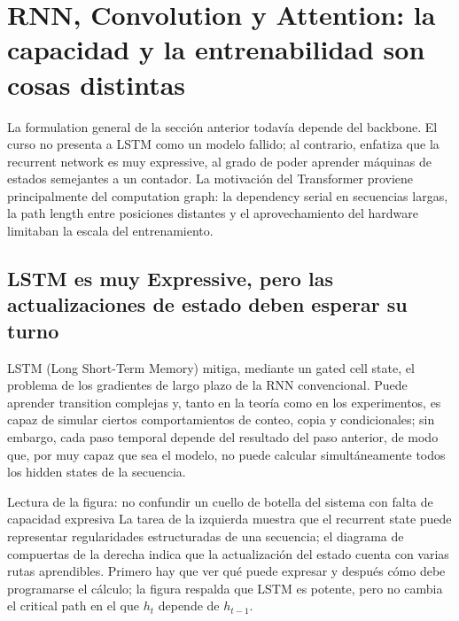 \section{RNN, Convolution y Attention: la capacidad y la entrenabilidad son cosas distintas}

La formulation general de la sección anterior todavía depende del backbone. El curso no presenta a LSTM como un modelo fallido; al contrario, enfatiza que la recurrent network es muy expressive, al grado de poder aprender máquinas de estados semejantes a un contador. La motivación del Transformer proviene principalmente del computation graph: la dependency serial en secuencias largas, la path length entre posiciones distantes y el aprovechamiento del hardware limitaban la escala del entrenamiento.

\subsection{LSTM es muy Expressive, pero las actualizaciones de estado deben esperar su turno}

LSTM (Long Short-Term Memory) mitiga, mediante un gated cell state, el problema de los gradientes de largo plazo de la RNN convencional. Puede aprender transition complejas y, tanto en la teoría como en los experimentos, es capaz de simular ciertos comportamientos de conteo, copia y condicionales; sin embargo, cada paso temporal depende del resultado del paso anterior, de modo que, por muy capaz que sea el modelo, no puede calcular simultáneamente todos los hidden states de la secuencia.


\begin{knowledgebox}{Lectura de la figura: no confundir un cuello de botella del sistema con falta de capacidad expresiva}
La tarea de la izquierda muestra que el recurrent state puede representar regularidades estructuradas de una secuencia; el diagrama de compuertas de la derecha indica que la actualización del estado cuenta con varias rutas aprendibles. Primero hay que ver qué puede expresar y después cómo debe programarse el cálculo; la figura respalda que LSTM es potente, pero no cambia el critical path en el que $h_t$ depende de $h_{t-1}$.
\end{knowledgebox}


